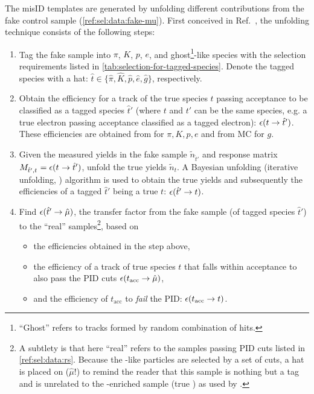 The misID templates are generated by unfolding different contributions from the
fake \muon control sample (\cref{ref:sel:data:fake-mu}).
First conceived in Ref.~\cite{LHCb-ANA-2016-059}, the unfolding technique
consists of the following steps:
\begin{enumerate}
    \item Tag the fake \muon sample into $\pi$, $K$, $p$,
        $e$, and ghost\footnote{
            ``Ghost'' refers to tracks formed by random combination of hits.
        }-like species with the selection requirements listed in
        \cref{tab:selection-for-tagged-species}.
        Denote the tagged species with a hat:
        $\hat{t} \in \{\hat{\pi}, \hat{K}, \hat{p}, \hat{e}, \hat{g}\}$,
        respectively.

    \item Obtain the efficiency for a track of the true species $t$ passing
        \muon acceptance to be classified as a tagged species $\hat{t}'$
        (where $t$ and $t'$ can be the same species, e.g. a true electron
        passing \muon acceptance classified as a tagged electron):
        $\misEff[t]{\hat{t}'}$.
        These efficiencies are obtained from \pidcalib for $\pi, K, p, e$ and
        from MC for $g$.

    \item Given the measured yields in the fake \muon sample $\tilde{n}_{\hat{t}'}
        $ and response matrix
        $M_{\hat{t}', t^{\phantom{}}} = \misEff[t^{\phantom{}}]{\hat{t}'}$,
        unfold the true yields $\tilde{n}_{t}$.
        A Bayesian unfolding (iterative unfolding, \cite{DAGOSTINI1995487})
        algorithm is used to obtain the true yields and subsequently the
        efficiencies of a tagged
        $\hat{t}'$ being a true $t$: $\misEff[\hat{t}']{t}$.

      \item Find $\misEff[\hat{t}']{\hat{\mu}}$,
        the transfer factor from the fake \muon sample
        (of tagged species $\hat{t}'$) to the ``real'' \muon
        samples\footnote{
            A subtlety is that here ``real'' \muon refers to the samples passing
            \muon PID cuts listed in \cref{ref:sel:data:rs}.
            Because the \muon-like particles are selected by a set of cuts,
            a hat is placed on \muon ($\hat{\mu}$!)
            to remind the reader that this sample is nothing but a \muon tag
            and is unrelated to the \muon-enriched sample (true \muon) as used
            by \pidcalib.
        },
        based on
        \begin{itemize}
            \item the efficiencies obtained in the step above,
            \item the efficiency of a track of true species $t$ that falls
                within \muon acceptance to also pass the \muon PID cuts
                $\misEff[t_\text{acc}]{\hat{\mu}}$,
            \item and the efficiency of $t_\text{acc}$ to \emph{fail} the \muon
                PID:
                $\misEff[t_\text{acc}]{t}$.
        \end{itemize}


\end{enumerate}
